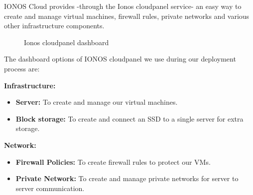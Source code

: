 IONOS Cloud provides -through the Ionos cloudpanel service- an easy way to create and manage virtual machines, firewall rules, private networks and various other infrastructure components.
\begin{figure}[H]
    \centering
    \caption{Ionos cloudpanel dashboard}
    \label{fig:image-of-ionos-cloudpanel-dashboard}
\end{figure}

The dashboard options of IONOS cloudpanel we use during our deployment process are:

\textbf{Infrastructure:}
\begin{itemize}
    \item \textbf{Server:} To create and manage our virtual machines.
    \item \textbf{Block storage:} To create and connect an SSD to a single server for extra storage.
\end{itemize}

\textbf{Network:}
\begin{itemize}
    \item \textbf{Firewall Policies:} To create firewall rules to protect our VMs.
    \item \textbf{Private Network:} To create and manage private networks for server to server communication.
\end{itemize}

